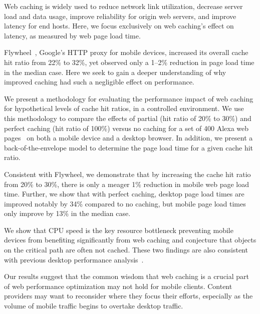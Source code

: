 \label{intro}
Web caching is widely used to reduce network link utilization, decrease server load and data usage, improve reliability for origin web servers, and improve latency for end hosts.
Here, we focus exclusively on web caching's effect on latency, as measured by web page load time.

Flywheel~\cite{flywheel}, Google's HTTP proxy for mobile devices, increased
its overall cache hit ratio from 22\% to 32\%, yet observed only a 1--2\% reduction in page load time in the median case.
Here we seek to gain a deeper understanding of why improved caching had such a negligible effect on performance.


We present a methodology for evaluating the performance impact of web caching for hypothetical levels of cache hit ratios, in a controlled environment.
We use this methodology to compare the effects of partial (hit ratio of 20\% to 30\%) and
perfect caching (hit ratio of 100\%) versus no caching for a set of 400 Alexa web pages~\cite{alexa} on both a mobile device and a desktop browser.
In addition, we present a back-of-the-envelope model to determine the page load time for a given cache hit ratio.

Consistent with Flywheel, we demonstrate that by increasing the cache hit ratio from 20\% to 30\%, there is only a meager 1\% reduction in mobile web page load time.
Further, we show that with perfect caching, desktop page load times are improved notably by 34\% compared to no caching, but mobile page load times only improve by 13\% in the median case.

We show that CPU speed is the key resource bottleneck preventing mobile devices from benefiting significantly from web caching and conjecture that objects on the critical path are often not cached. These two findings are also consistent with previous desktop performance analysis~\cite{wang2013demystifying}.

Our results suggest that the common wisdom that web caching is a crucial part of web performance optimization may not hold for mobile clients. Content providers may want to reconsider where they focus their efforts, especially as the volume of mobile traffic begins to overtake desktop traffic.

